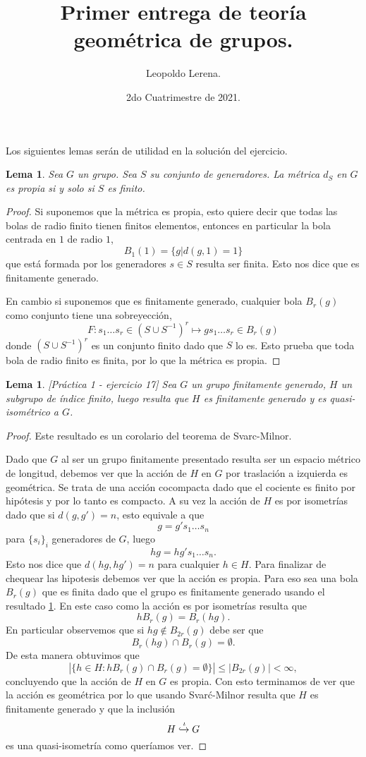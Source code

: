 \documentclass[11pt]{article}
\title{\color{red!55!black} Primer entrega de teoría geométrica de grupos.}
\author{Leopoldo Lerena.}
\date{2do Cuatrimestre de 2021.}
\theoremstyle{plain}
\newtheorem{lema}[teo]{Lema}
\theoremstyle{definition}
\theoremstyle{remark}
\begin{document}
\maketitle
Los siguientes lemas serán de utilidad en la solución del ejercicio.
\begin{lema}\label{fgsiipropio}
	Sea $G$ un grupo. Sea $S$ su conjunto de generadores. La métrica $d_S$ en $G$ es \textit{propia} si y solo si $S$ es finito.
\end{lema}
\begin{proof}
	Si suponemos que la métrica es propia, esto quiere decir que todas las bolas de radio finito tienen finitos elementos, entonces en particular la bola centrada en $1$ de radio $1$,
	\[
	B_1(1) = \{g | d(g,1)=1\}
	\]
	que está formada por los generadores $s \in S$ resulta ser finita. Esto nos dice que es finitamente generado.
	
	\medskip
	
	En cambio si suponemos que es finitamente generado, cualquier bola $B_r(g)$ como conjunto tiene una sobreyección,
	\[
	F: s_1 \dots s_r \in (S \cup S^{-1})^{r} \mapsto gs_1 \dots s_r \in B_r(g)
	\]
	donde $(S \cup S^{-1})^{r}$ es un conjunto finito dado que $S$ lo es. Esto prueba que toda bola de radio finito es finita, por lo que la métrica es propia.
\end{proof}
\bigskip
\begin{lema}\label{coro-svarc-milnor}[Práctica 1 - ejercicio 17]
	Sea $G$ un grupo finitamente generado, $H$ un subgrupo de índice finito, luego resulta que $H$ es finitamente generado y es quasi-isométrico a $G$.
\end{lema}
\begin{proof}
	Este resultado es un corolario del teorema de Svarc-Milnor. 
	
	Dado que $G$ al ser un grupo finitamente presentado resulta ser un espacio métrico de longitud, debemos ver que la acción de $H$ en $G$ por traslación a izquierda es geométrica. Se trata de una acción cocompacta dado que el cociente es finito por hipótesis y por lo tanto es compacto. A su vez la acción de $H$ es por isometrías dado que si $d(g,g')=n$, esto equivale a que
	\[
	g = g' s_1 \dots s_n
	\]
	para $\{s_i\}_i$ generadores de $G$, luego 
	\[
	hg = hg' s_1 \dots s_n.
	\]
	Esto nos dice que $d(hg,hg')=n$ para cualquier $h \in H$. Para finalizar de chequear las hipotesis debemos ver que la acción es propia. Para eso sea una bola $B_r(g)$ que es finita dado que el grupo es finitamente generado usando el resultado \ref{fgsiipropio}. En este caso como la acción es por isometrías resulta que
	\[
	hB_r(g) = B_r(hg).
	\]
	En particular observemos que si $hg \notin B_{2r}(g)$ debe ser que
	\[
	B_r(hg) \cap B_r(g) = \emptyset.
	\]
	De esta manera obtuvimos que
	\[
	|\{ h \in H: hB_r(g) \cap B_r(g) = \emptyset \}| \le |B_{2r}(g)| < \infty,
	\]
	concluyendo que la acción de $H$ en $G$ es propia. Con esto terminamos de ver que la acción es geométrica por lo que usando Svarć-Milnor resulta que $H$ es finitamente generado y que la inclusión
	\[
	H \xhookrightarrow{\iota} G
	\]
	es una quasi-isometría como queríamos ver.
\end{proof}
\end{document}
